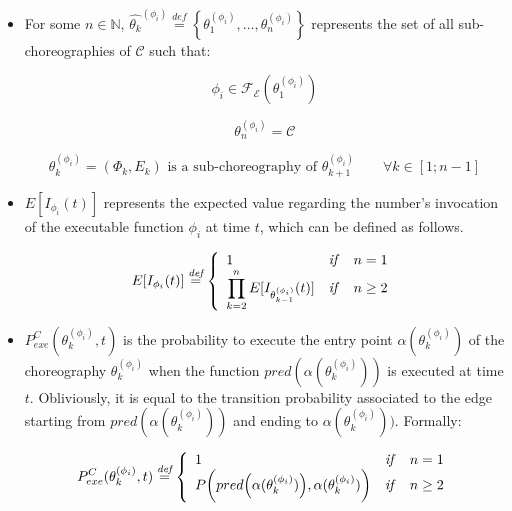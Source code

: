 \documentclass[12pt,a4paper]{report}
\newcommand{\mathDef}{\overset{\textit{def}}{=}}
\newcommand{\N}{\mathbb{N}}
\begin{document}
\begin{itemize}
	\item For some $n \in \N$, $\widehat{\theta_k}^{(\phi_i)} \mathDef \left\{ \theta^{(\phi_i)}_1, \ldots, \theta^{(\phi_i)}_n \right\}$ represents the set of all sub-choreographies of $\mathcal{C}$ such that:
	
	\begin{equation}
		\phi_i \in \mathscr{F_E}(\theta^{(\phi_i)}_1)
	\end{equation}
	
	\begin{equation}
		\theta^{(\phi_i)}_n = \mathcal{C}
	\end{equation}
	
	\begin{equation}
		\theta^{(\phi_i)}_k = (\Phi_k, E_k) \text{ is a sub-choreography of } \theta^{(\phi_i)}_{k+1} \qquad \forall k \in \left[1;n-1\right]
	\end{equation}

	\item $E[I_{\phi_i}(t)]$ represents the expected value regarding the number's invocation of the executable function $\phi_i$ at time $t$, which can be defined as follows.
	
	\begin{equation}	
		E[I_{\phi_i}(t)] \mathDef \left\{
		\begin{array}{lcr}
			1 & \text{\textit{if}} & n = 1 \\ 
			\displaystyle \prod_{k = 2}^n E[I_{\theta_{k-1}^{(\phi_i)}}(t)] & \text{\textit{if}} & n \geq 2 \\
		\end{array} \right.
	\end{equation}
	
	\item $P_{exe}^C(\theta^{(\phi_i)}_k, t)$ is the probability to execute the entry point $\alpha(\theta^{(\phi_i)}_k)$ of the choreography $\theta^{(\phi_i)}_k$ when the function $pred(\alpha(\theta^{(\phi_i)}_k))$ is executed at time $t$. Obliviously, it is equal to the transition probability associated to the edge starting from $pred( \alpha(\theta^{(\phi_i)}_{k}) )$ and ending to $\alpha(\theta^{(\phi_i)}_{k}))$. Formally:
	
	\begin{equation}	
		P_{exe}^C(\theta^{(\phi_i)}_k, t) \mathDef \left\{
		\begin{array}{lcr}
			1 & \text{\textit{if}} & n = 1 \\ 
			P \bigg(  pred\Big( \alpha(\theta^{(\phi_i)}_{k}) \Big), \alpha(\theta^{(\phi_i)}_{k}) \bigg) & \text{\textit{if}} & n \geq 2 \\
		\end{array} \right.
	\end{equation}
	

\end{itemize}
\end{document}
